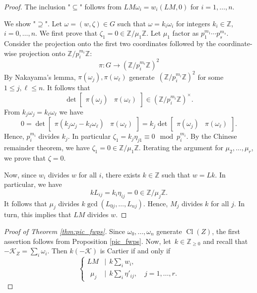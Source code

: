 \documentclass{amsart}
\DeclareMathOperator{\Cl}{Cl}
\newcommand{\Z}{\mathbb{Z}}
\theoremstyle{definition}
\begin{document}
\begin{proof}
    The inclusion "$\subseteq$" follows from
    $
    LM\omega_i=w_i(LM,0)$ for $i=1,\dots,n.
    $
    
    We show "$\supseteq$". Let $\omega=(w,\zeta)\in G$ such that $\omega=k_i\omega_i$ for integers $k_i\in\Z$, $i=0,\dots,n$. We first prove that $\zeta_1= 0\in\Z/\mu_1\Z$.
    Let $\mu_1$ factor as $p_1^{m_1}\cdots p_s^{m_s}$.
    Consider the projection onto the first two coordinates followed by the coordinate-wise projection onto $\Z/p_i^{m_i}\Z$:
    $$
    \pi\colon  G\rightarrow (\Z/p_i^{m_i}\Z)^2
    $$
    By Nakayama's lemma, $\pi(\omega_j),\pi(\omega_\ell)$ generate~$(\Z/p_i^{m_i}\Z)^2$ for some $1\leq j,\ell\leq n$.
    It follows that
    $$\det\begin{bmatrix}\pi(\omega_j) & \pi(\omega_\ell)
    \end{bmatrix}\in(\Z/p_i^{m_i}\Z)^\times.$$
    From $k_j\omega_j=k_\ell\omega_\ell$ we have
    $$    0=\det\begin{bmatrix}\pi(k_j\omega_j-k_\ell\omega_\ell) & \pi(\omega_\ell)
    \end{bmatrix}=k_j\det\begin{bmatrix}\pi(\omega_j) & \pi(\omega_\ell)
    \end{bmatrix}.
    $$
    Hence, $p_i^{m_i}$ divides $k_j$. In particular
    $\zeta_1=k_j\eta_{j1}\equiv 0 \mod p_i^{m_i}$.
    By the Chinese remainder theorem, we have $\zeta_1=0\in\Z/\mu_1\Z$. Iterating the argument for $\mu_2,\dots,\mu_r$, we prove that $\zeta=0$.
    
    Now, since $w_i$ divides $w$ for all $i$, there exists $k\in\Z$ such that $w=Lk$. In particular, we have
    $$
    kL_{ij}=k_i\eta_{ij}=0\in\Z/\mu_j\Z.
    $$
    It follows that $\mu_j$ divides
    $
    k\gcd\left(L_{0j},\dots,L_{nj}\right).
    $
    Hence, $M_j$ divides $k$ for all $j$. In turn, this implies that $LM$ divides $w$.
\end{proof}

\begin{proof}[Proof of Theorem \ref{thm:pic_fwps}]
    Since $\omega_0,\dots,\omega_n$ generate $\Cl(Z)$, the first assertion follows from Proposition \ref{pic_fwps}.
    Now, let~$k\in\Z_{\geq 0}$ and recall that $-\mathcal{K}_Z=\sum_i\omega_i$. Then $k(-\mathcal{K})$ is Cartier if and only if
    $$
    \begin{cases}
        LM &| \ \ k\sum_i w_i,\\
        \ \ \mu_j &| \ \ k\sum_i\eta'_{ij},\quad j=1,\dots,r.
    \end{cases}
    $$
    
\end{proof}
\end{document}
